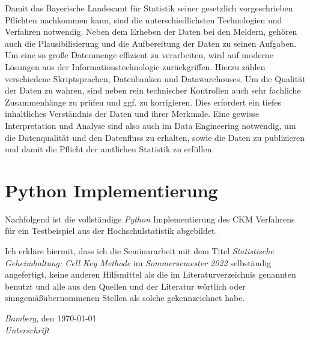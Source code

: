Damit das Bayerische Landesamt für Statistik seiner gesetzlich vorgeschrieben Pflichten nachkommen kann, sind die unterschiedlichsten Technologien und Verfahren notwendig. Neben dem Erheben der Daten bei den Meldern, gehören auch die Plausibilisierung und die Aufbereitung der Daten zu seinen Aufgaben. Um eine so große Datenmenge effizient zu verarbeiten, wird auf moderne Lösungen aus der Informationstechnologie zurückgriffen. Hierzu zählen verschiedene Skriptsprachen, Datenbanken und Datawarehouses. Um die Qualität der Daten zu wahren, sind neben rein technischer Kontrollen auch sehr fachliche Zusammenhänge zu prüfen und ggf. zu korrigieren. Dies erfordert ein tiefes inhaltliches Verständnis der Daten und ihrer Merkmale. Eine gewisse Interpretation und Analyse sind also auch im Data Engineering notwendig, um die Datenqualität und den Datenfluss zu erhalten, sowie die Daten zu publizieren und damit die Pflicht der amtlichen Statistik zu erfüllen. 

\newpage%

%

\newpage 
\appendix
\section{Python Implementierung}

Nachfolgend ist die vollständige \textit{Python} Implementierung des CKM Verfahrens für ein Testbeispiel aus der Hochschulstatistik abgebildet.





\newpage 
\noindent%
Ich erkläre hiermit, dass ich die Seminararbeit mit dem Titel \emph{Statistische Geheimhaltung: Cell Key Methode} im \emph{Sommersemester 2022} selbständig angefertigt, keine anderen Hilfsmittel als die im Literaturverzeichnis genannten benutzt und alle aus den Quellen und der Literatur wörtlich oder sinngemä\ss übernommenen Stellen als solche gekennzeichnet habe.%
\bigskip
 
\noindent%
\emph{Bamberg}, den \today\\%
\emph{Unterschrift}%

%

